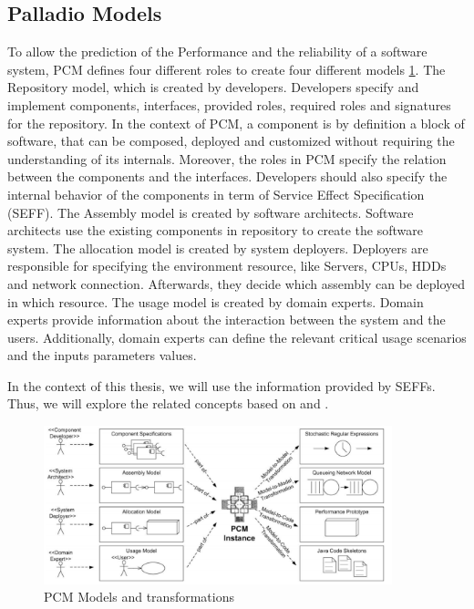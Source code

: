 \subsection{Palladio Models}
\label{sec: Palladio Models}
To allow the prediction of the Performance and the reliability of a software system, PCM defines four different roles to create four different models \ref{fig:PCM Models and transformations}. The Repository model, which is created by developers. Developers specify and implement components, interfaces, provided roles, required roles and signatures for the repository. In the context of PCM, a component is by definition a block of software, that can be composed, deployed and customized without requiring the understanding of its internals.  Moreover, the roles in PCM specify the relation between the components and the interfaces. Developers should also specify the internal behavior of the components in term of Service Effect Specification (SEFF). The Assembly model is created by software architects. Software architects use the existing components in repository to create the software system. The allocation model is created by system deployers.  Deployers are responsible for specifying the environment resource, like Servers, CPUs, HDDs and network connection. Afterwards, they decide which assembly can be deployed in which resource. The usage model is created by domain experts. Domain experts provide information about the interaction between the system and the users. Additionally, domain experts can define the relevant critical usage scenarios and the inputs parameters values. 

In the context of this thesis, we will use the information provided by SEFFs. Thus, we will explore the related concepts based on \cite{becker2009palladio} and \cite{koziolek2006parameter}.

\begin{figure}[h]
\centering
\includegraphics[width=0.9\textwidth]{figures/pcmmodels}
\caption{PCM Models and transformations \cite{reussner2016modeling}}
\label{fig:PCM Models and transformations}
\end{figure}



